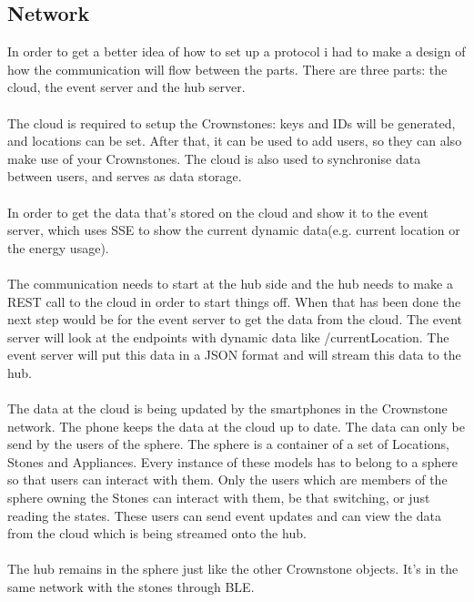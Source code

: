 \documentclass{article}
\begin{document}
\subsection{Network}\label{sec:network} 
In order to get a better idea of how to set up a protocol i had to make a design of how the communication will flow between the parts. There are three parts: the cloud, the event server and the hub server. \\
\\
The cloud is required to setup the Crownstones: keys and IDs will be generated, and locations can be set. After that, it can be used to add users, so they can also make use of your Crownstones. The cloud is also used to synchronise data between users, and serves as data storage.\\
\\
In order to get the data that's stored on the cloud and show it to the event server, which uses SSE to show the current dynamic data(e.g. current location or the energy usage).\\
 \\
The communication needs to start at the hub side and the hub needs to make a REST call to the cloud in order to start things off. When that has been done the next step would be for the event server to get the data from the cloud. The event server will look at the endpoints with dynamic data like /currentLocation. The event server will put this data in a JSON format and will stream this data to the hub.\\
\\
The data at the cloud is being updated by the smartphones in the Crownstone network. The phone keeps the data at the cloud up to date.  The  data can only be send by the users of the sphere. The sphere is a container of a set of Locations, Stones and Appliances. Every instance of these models has to belong to a sphere so that users can interact with them. Only the users which are members of the sphere owning the Stones can interact with them, be that switching, or just reading the states. These users can send event updates and can view the data from the cloud which is being streamed onto the hub.\\
\\
The hub remains in the sphere just like the other Crownstone objects. It's in the same network with the stones through BLE. \\


\\
\end{document}
